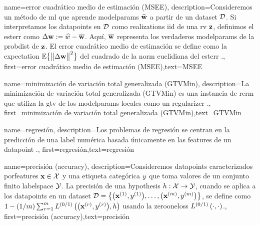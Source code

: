 {{
{name={error cuadrático medio de estimación (MSEE)},
	description={Consideremos un método de \gls{ml} que aprende 
		\gls{modelparams} $\widehat{{\bf w}}$ a partir de un \gls{dataset} $\mathcal{D}$. 
		Si interpretamos los \gls{datapoint}s en $\mathcal{D}$ como \gls{realization}s \gls{iid} de una \gls{rv} ${\bf z}$, 
		definimos el \gls{esterr} como $\Delta {\bf w} := \widehat{w} - \overline{{\bf w}}$. 
		Aquí, $\overline{{\bf w}}$ representa los verdaderos \gls{modelparams} de la \gls{probdist} 
		de ${\bf z}$. El error cuadrático medio de estimación se define como la \gls{expectation} $\mathbb{E} \big\{ \big\| \Delta {\bf w} \big\|^{2} \big\}$ del cuadrado de la 
		\gls{norm} euclidiana del \gls{esterr} \cite{LC,kay}.},
	first={error cuadrático medio de estimación (MSEE)},text={MSEE} 
}

{name={minimización de variación total generalizada (GTVMin)},
	description={La minimización de variación total generalizada (GTVMin) es una instancia de \gls{rerm} 
	que utiliza la \gls{gtv} de los \gls{modelparams} locales como un \gls{regularizer} \cite{ClusteredFLTVMinTSP}.},
	first={minimización de variación total generalizada (GTVMin)},text={GTVMin} 
}

{name={regresión},
	description={Los problemas de regresión se centran en la predicción de una 
		\gls{label} numérica basada únicamente en las \gls{feature}s de un \gls{datapoint} \cite[Ch. 2]{MLBasics}.},
	first={regresión},text={regresión} 
}

{name={precisión (accuracy)},
	description={Consideremos \gls{datapoint}s caracterizados por\gls{feature}s ${\bf x} \in \mathcal{X}$ y 
		una etiqueta categórica $y$ que toma valores de un conjunto finito \gls{labelspace} $\mathcal{Y}$. La 
		precisión de una \gls{hypothesis} $h: \mathcal{X} \rightarrow \mathcal{Y}$, cuando se aplica a los
		\gls{datapoint}s en un \gls{dataset} $\mathcal{D} = \big\{ \big({\bf x}^{(1)}, y^{(1)} \big), \ldots, \big({\bf x}^{(m)},y^{(m)}\big) \big\}$, 
		se define como $1 - (1/m)\sum_{r=1}^{m} L^{(0/1)}\left(\big({\bf x}^{(r)},y^{(r)}\big),h \right)$ usando la \gls{zerooneloss} $L^{(0/1)}\left(\cdot,\cdot \right)$.},
	first={precisión (accuracy)},text={precisión} 
}



}}
